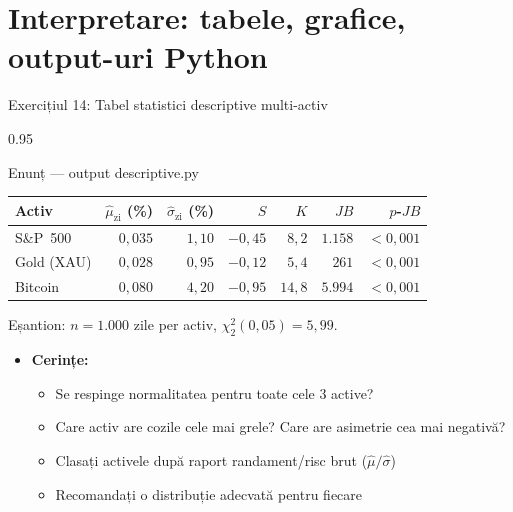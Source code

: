 \documentclass[9pt, aspectratio=169, t]{beamer}
\begin{document}
\section{Interpretare: tabele, grafice, output-uri Python}

\begin{frame}[shrink=25]{Exercițiul 14: Tabel statistici descriptive multi-activ}
\begin{cminipage}{0.95\textwidth}
\begin{block}{Enunț --- output descriptive.py}
\small
\renewcommand{\arraystretch}{1.2}
\begin{center}
\begin{tabular}{lrrrrrr}
\toprule
\textbf{Activ} & $\hat\mu_{\text{zi}}$ (\%) & $\hat\sigma_{\text{zi}}$ (\%) & $S$ & $K$ & $JB$ & $p$-$JB$ \\
\midrule
S\&P~500 & $0{,}035$ & $1{,}10$ & $-0{,}45$ & $8{,}2$ & $1.158$ & $< 0{,}001$ \\
Gold (XAU) & $0{,}028$ & $0{,}95$ & $-0{,}12$ & $5{,}4$ & $261$ & $< 0{,}001$ \\
Bitcoin & $0{,}080$ & $4{,}20$ & $-0{,}95$ & $14{,}8$ & $5.994$ & $< 0{,}001$ \\
\bottomrule
\end{tabular}
\end{center}
Eșantion: $n = 1.000$ zile per activ, $\chi^2_2(0{,}05) = 5{,}99$.
\end{block}
\begin{itemize}\setlength{\itemsep}{0pt}
    \item \textbf{Cerințe:}
    \begin{itemize}\setlength{\itemsep}{0pt}
        \item Se respinge normalitatea pentru toate cele 3 active?
        \item Care activ are cozile cele mai grele? Care are asimetrie cea mai negativă?
        \item Clasați activele după raport randament/risc brut ($\hat\mu / \hat\sigma$)
        \item Recomandați o distribuție adecvată pentru fiecare
    \end{itemize}
\end{itemize}
\end{cminipage}
\end{frame}
\end{document}
